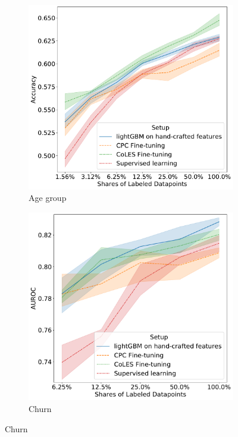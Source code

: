 \documentclass[sigconf, anonymous]{acmart}
\begin{document}
\begin{figure}
  \centering
  \begin{subfigure}{0.25\linewidth}
    \caption{Age group}
    \includegraphics[width=\linewidth]{figures/ss_age_pred_per.pdf}
  \end{subfigure}%
  \begin{subfigure}{0.25\linewidth}
    \caption{Churn}
    \includegraphics[width=\linewidth]{figures/ss_rosbank_per.pdf}

\end{subfigure}
\end{figure}
\end{document}
